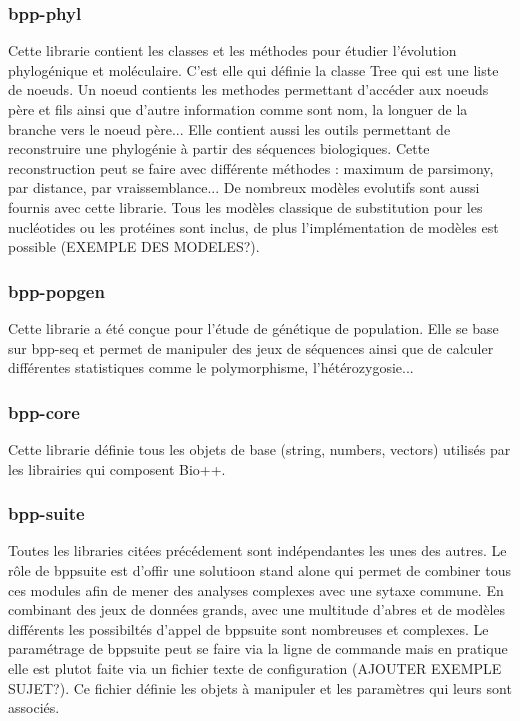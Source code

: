 	\subsubsection*{bpp-phyl}
	Cette librarie contient les classes et les méthodes pour étudier l'évolution phylogénique et moléculaire. C'est elle qui définie la classe Tree qui est une liste de noeuds. Un noeud contients les methodes permettant d'accéder aux noeuds père et fils ainsi que d'autre information comme sont nom, la longuer de la branche vers le noeud père...
	Elle contient aussi les outils permettant de reconstruire une phylogénie à partir des séquences biologiques. Cette reconstruction peut se faire avec différente méthodes : maximum de parsimony, par distance, par vraissemblance...
	De nombreux modèles evolutifs sont aussi fournis avec cette librarie. Tous les modèles classique de substitution pour les nucléotides ou les protéines sont inclus, de plus l'implémentation de modèles est possible (EXEMPLE DES MODELES?).
	\subsubsection*{bpp-popgen}
	Cette librarie a été conçue pour l'étude de génétique de population. Elle se base sur bpp-seq et permet de manipuler des jeux de séquences ainsi que de calculer différentes statistiques comme le polymorphisme, l'hétérozygosie...
	
	\subsubsection*{bpp-core}
	Cette librarie définie tous les objets de base (string, numbers, vectors) utilisés par les librairies qui composent Bio++.
	
	\subsubsection*{bpp-suite}
	Toutes les libraries citées précédement sont indépendantes les unes des autres. Le rôle de bppsuite est d'offir une solutioon stand alone qui permet de combiner tous ces modules afin de mener des analyses complexes avec une sytaxe commune. En combinant des jeux de données grands, avec une multitude d'abres et de modèles différents les possibiltés d'appel de bppsuite sont nombreuses et complexes. Le paramétrage de bppsuite peut se faire via la ligne de commande mais en pratique elle est plutot faite via un fichier texte de configuration (AJOUTER EXEMPLE SUJET?). Ce fichier définie les objets à manipuler et les paramètres qui leurs sont associés.
	

